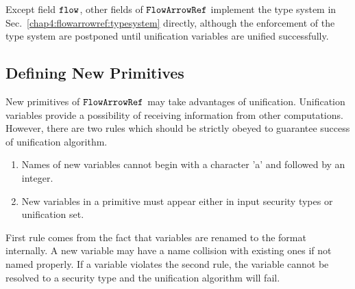 \documentclass{report}
\newcommand{\co}[1]{$\cod{#1}$}
\begin{document}

Except field \co{flow}, other fields of \co{FlowArrowRef} implement the type system 
in Sec.~\ref{chap4:flowarrowref:typesystem} directly, although the enforcement of the type system are 
postponed until unification variables are unified successfully.

\subsection{Defining New Primitives}
New primitives of \co{FlowArrowRef} may take advantages of unification.
Unification variables provide a possibility of receiving information from 
other computations.
However, there are two rules which should be strictly obeyed to guarantee success of unification
algorithm.
\begin{enumerate}
\item Names of new variables cannot begin with a character 'a' and followed by an integer.
\item New variables in a primitive must appear either in input security types or unification set.
\end{enumerate}
First rule comes from the fact that variables are renamed to the format internally. A new variable may 
have a name collision with existing ones if not named properly. 
If a variable violates the second rule, the variable cannot be resolved to a security type and the
unification algorithm will fail.
\end{document}
